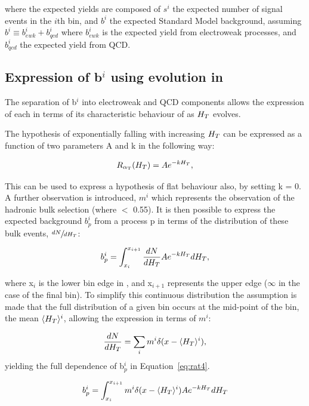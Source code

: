 where the expected yields are composed of $s^{i}$ the expected number of signal events in the $i$th bin, and $b^{i}$ the expected Standard Model background, assuming $b^{i} \equiv b^{i}_{ewk} + b^{i}_{qcd}$ where $b^{i}_{ewk}$ is the expected yield from electroweak processes, and $b^{i}_{qcd}$ the expected yield from QCD. 

\subsection{Expression of b$^{i}$ using \RaT evolution in \HT}

The separation of b$^{i}$ into electroweak and QCD components allows the expression of each in terms of its characteristic behaviour of \RaT as $H_{T}$ evolves. 

The hypothesis of \RaT exponentially falling with increasing $H_{T}$ can be expressed as a function of two parameters A and k in the following way:

\begin{equation}
R_{\alpha_{\text{T}}}(H_{T}) = Ae^{-kH_{T}},
\label{eq:rat1}
\end{equation}

This can be used to express a hypothesis of flat behaviour also, by setting k = 0. A further observation is introduced, $m^{i}$ which represents the observation of the hadronic bulk selection (where \alt $<$ 0.55). It is then possible to express the expected background $b^{i}_{p}$ from a process p in terms of the \HT distribution of these bulk events, $\sfrac{dN}{dH_{T}}$:

\begin{equation}
b^{i}_{p} = \int_{x_{i}}^{x_{i+1}} \frac{dN}{dH_{T}}Ae^{-kH_{T}} dH_{T},
\label{eq:rat2}
\end{equation}

where x$_{i}$ is the lower bin edge in \HT, and x$_{i+1}$ represents the upper edge ($\infty$ in the case of the final bin). To simplify this continuous distribution the assumption is made that the full distribution of a given bin occurs at the mid-point of the bin, the mean $\langle H_{T} \rangle^{i}$, allowing the expression in terms of $m^{i}$:

\begin{equation}
\frac{dN}{dH_{T}} = \sum_{i} m^{i} \delta(x - \langle H_{T} \rangle^{i}),
\label{eq:rat3}
\end{equation}
yielding the full dependence of b$^{i}_{p}$ in Equation~\ref{eq:rat4}. 


\begin{equation}
b^{i}_{p} = \int_{x_{i}}^{x_{i+1}} m^{i} \delta(x - \langle H_{T} \rangle^{i}) Ae^{-kH_{T}} dH_{T}
\label{eq:rat4}
\end{equation}

